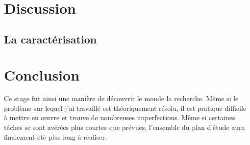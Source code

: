 \documentclass[10pt]{report}
\begin{document}
\chapter{Discussion}

\section{La caractérisation}




	
\chapter{Conclusion}

Ce stage fut ainsi une manière de découvrir le monde la recherche. Même si le problème sur lequel j'ai travaillé est théoriquement résolu, il est pratique difficile à mettre en œuvre et trouve de nombreuses imperfections. Même si certaines tâches se sont avérées plus courtes que prévues, l'ensemble du plan d'étude aura finalement été plus long à réaliser.\\
\end{document}
